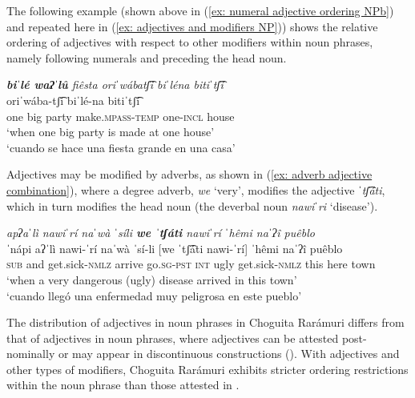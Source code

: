     \z
\z

The following example (shown above in (\ref{ex: numeral adjective ordering NPb}) and repeated here in (\ref{ex: adjectives and modifiers NP})) shows the relative ordering of adjectives with respect to other modifiers within noun phrases, namely following numerals and preceding the head noun.

\ea\label{ex: adjectives and modifiers NP}

    \textit{\textbf{biˈlé waʔˈlû} fiêsta oriˈwábatʃ͡i biˈléna bitiˈtʃ͡í}\\
     oriˈwába-tʃ͡i biˈlé-na bitiˈtʃ͡í\\
            one big party make.\textsc{mpass}-\textsc{temp} one-\textsc{incl} house\\
    \glt    `when one big party is made at one house'\\
    \glt    `cuando se hace una fiesta grande en una casa' \\

\z

Adjectives may be modified by adverbs, as shown in (\ref{ex: adverb adjective combination}), where a degree adverb, \textit{we} `very', modifies the adjective \textit{ˈtʃ͡áti}, which in turn modifies the head noun (the deverbal noun \textit{nawiˈri} `disease').

\ea\label{ex: adverb adjective combination}

\textit{apʔaˈlì nawiˈrí naˈwà ˈsíli \textbf{we ˈtʃáti} nawiˈrí ˈhêmi naˈʔî puêblo}\\
\gll    ˈnápi aʔˈlì nawi-ˈrí naˈwà ˈsí-li [we ˈtʃ͡áti nawi-ˈrí] ˈhêmi naˈʔî puêblo\\
        \textsc{sub} and get.sick-\textsc{nmlz} arrive go.\textsc{sg-pst} \textsc{int} ugly get.sick-\textsc{nmlz} this here town\\
\glt    `when a very dangerous (ugly) disease arrived in this town'\\
\glt    `cuando llegó una enfermedad muy peligrosa en este pueblo'    \\

\z

The distribution of adjectives in noun phrases in Choguita Rarámuri differs from that of adjectives in  noun phrases, where adjectives can be attested post-nominally or may appear in discontinuous constructions (\citealt{miller1996guarijio}). With adjectives and other types of modifiers, Choguita Rarámuri exhibits stricter ordering restrictions within the noun phrase than those attested in .

